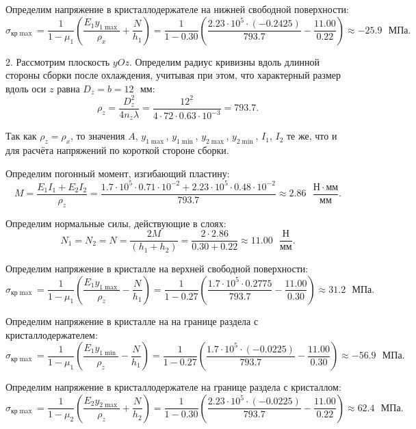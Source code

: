Определим напряжение в кристаллодержателе на нижней свободной поверхности:
\[
    \sigma_{кр \max} = \frac{1}{1 - \mu_1} \left(\frac{E_1 y_{1\max}}{\rho_x} + \frac{N}{h_1}\right)
                     = \frac{1}{1 - 0.30} \left(\frac{2.23 \cdot 10^5 \cdot (-0.2425)}{793.7} - \frac{11.00}{0.22}\right)
                     \approx -25.9\text{ } МПа.
\]

2. Рассмотрим плоскость $yOz$. Определим радиус кривизны вдоль длинной стороны сборки после охлаждения, учитывая при этом, что характерный размер вдоль оси $z$ равна $D_z = b = 12 \text{ } мм$:
\[
    \rho_z = \frac{D_z^2}{4 n_z \lambda}
           = \frac{12^2}{4 \cdot 72 \cdot 0.63 \cdot 10^{-3}}
           = 793.7.
\]

Так как $\rho_z = \rho_x$, то значения $A$, $y_{1 \max}$, $y_{1 \min}$, $y_{2 \max}$, $y_{2 \min}$, $I_1$, $I_2$ те же, что и для расчёта напряжений по короткой стороне сборки.

Определим погонный момент, изгибающий пластину:
\[
    M = \frac{E_1 I_1 + E_2 I_2}{\rho_z}
      = \frac{1.7 \cdot 10^5 \cdot 0.71 \cdot 10^{-2} + 2.23 \cdot 10^5 \cdot 0.48 \cdot 10^{-2}}{793.7}
      \approx 2.86 \text{ } \frac{Н \cdot мм}{мм}.
\]

Определим нормальные силы, действующие в слоях:
\[
    N_1 = N_2 = N
        = \frac{2M}{(h_1 + h_2)}
        = \frac{2 \cdot 2.86}{0.30 + 0.22}
        \approx 11.00 \text{ } \frac{Н}{мм}.
\]

Определим напряжение в кристалле на верхней свободной поверхности:
\[
    \sigma_{кр \max} = \frac{1}{1 - \mu_1} \left(\frac{E_1 y_{1\max}}{\rho_z} - \frac{N}{h_1}\right)
                     = \frac{1}{1 - 0.27} \left(\frac{1.7 \cdot 10^5 \cdot 0.2775}{793.7} - \frac{11.00}{0.30}\right)
                     \approx 31.2 \text{ } МПа.
\]

Определим напряжение в кристалле на на границе раздела с кристаллодержателем:
\[
    \sigma_{кр \max} = \frac{1}{1 - \mu_1} \left(\frac{E_1 y_{1\min}}{\rho_z} - \frac{N}{h_1}\right)
                     = \frac{1}{1 - 0.27} \left(\frac{1.7 \cdot 10^5 \cdot (-0.0225)}{793.7} - \frac{11.00}{0.30}\right)
                     \approx -56.9\text{ } МПа.
\]

Определим напряжение в кристаллодержателе на границе раздела с кристаллом:
\[
    \sigma_{кр \max} = \frac{1}{1 - \mu_2} \left(\frac{E_2 y_{2\max}}{\rho_z} + \frac{N}{h_2}\right)
                     = \frac{1}{1 - 0.30} \left(\frac{2.23 \cdot 10^5 \cdot (-0.0225)}{793.7} - \frac{11.00}{0.22}\right)
                     \approx 62.4\text{ } МПа.
\]

